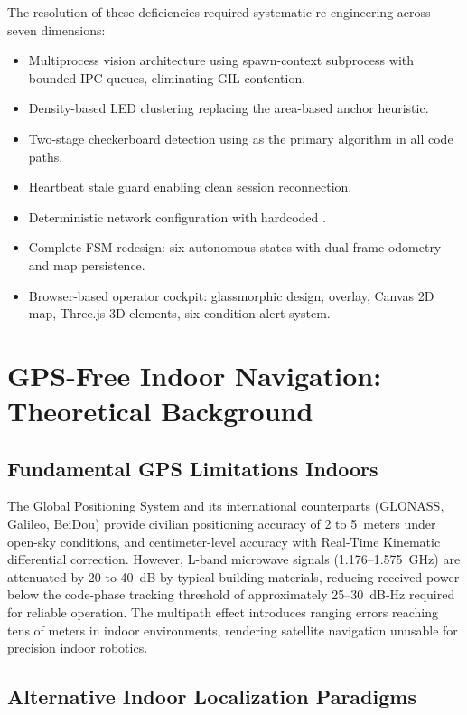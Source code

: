 The resolution of these deficiencies required systematic re-engineering across seven dimensions:

\begin{itemize}[leftmargin=1.4em]
  \item Multiprocess vision architecture using spawn-context subprocess with bounded IPC queues, eliminating GIL contention.
  \item Density-based LED clustering replacing the area-based anchor heuristic.
  \item Two-stage checkerboard detection using  as the primary algorithm in all code paths.
  \item Heartbeat stale guard enabling clean session reconnection.
  \item Deterministic network configuration with hardcoded .
  \item Complete FSM redesign: six autonomous states with dual-frame odometry and map persistence.
  \item Browser-based operator cockpit: glassmorphic design,  overlay, Canvas 2D map, Three.js 3D elements, six-condition alert system.
\end{itemize}

\section{GPS-Free Indoor Navigation: Theoretical Background}

\subsection{Fundamental GPS Limitations Indoors}

The Global Positioning System and its international counterparts (GLONASS, Galileo, BeiDou) provide civilian positioning accuracy of 2 to 5~meters under open-sky conditions, and centimeter-level accuracy with Real-Time Kinematic differential correction. However, L-band microwave signals (1.176--1.575~GHz) are attenuated by 20 to 40~dB by typical building materials, reducing received power below the code-phase tracking threshold of approximately 25--30~dB-Hz required for reliable operation. The multipath effect introduces ranging errors reaching tens of meters in indoor environments, rendering satellite navigation unusable for precision indoor robotics.

\subsection{Alternative Indoor Localization Paradigms}


